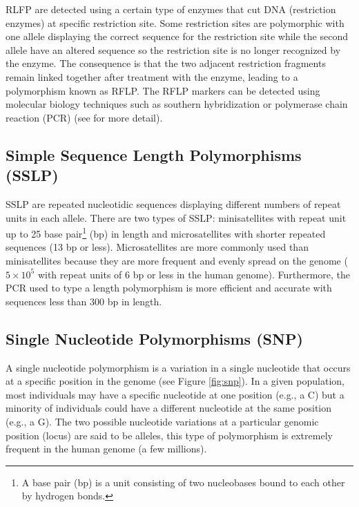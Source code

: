 \documentclass[]{book}
\begin{document}
RLFP are detected using a certain type of enzymes that cut DNA
(restriction enzymes) at specific restriction site. Some restriction
sites are polymorphic with one allele displaying the correct sequence
for the restriction site while the second allele have an altered
sequence so the restriction site is no longer recognized by the enzyme.
The consequence is that the two adjacent restriction fragments remain
linked together after treatment with the enzyme, leading to a
polymorphism known as RFLP. The RFLP markers can be detected using
molecular biology techniques such as southern hybridization or
polymerase chain reaction (PCR) (see \citep{garibyan2013research} for more
detail).

\hypertarget{simple-sequence-length-polymorphisms-sslp}{%
\subsection{Simple Sequence Length Polymorphisms (SSLP)}\label{simple-sequence-length-polymorphisms-sslp}}

SSLP are repeated nucleotidic sequences displaying different numbers of
repeat units in each allele. There are two types of SSLP: minisatellites
with repeat unit up to 25 base pair\footnote{A base pair (bp) is a unit consisting of two nucleobases bound to
  each other by hydrogen bonds.} (bp) in length and
microsatellites with shorter repeated sequences (13 bp or less).
Microsatellites are more commonly used than minisatellites because they
are more frequent and evenly spread on the genome (\(5 \times 10^5\) with
repeat units of 6 bp or less in the human genome). Furthermore, the PCR
used to type a length polymorphism is more efficient and accurate with
sequences less than 300 bp in length.

\hypertarget{single-nucleotide-polymorphisms-snp}{%
\subsection{Single Nucleotide Polymorphisms (SNP)}\label{single-nucleotide-polymorphisms-snp}}

A single nucleotide polymorphism is a variation in a single nucleotide
that occurs at a specific position in the genome (see Figure \ref{fig:snp}). In a given population, most individuals may have a
specific nucleotide at one position (e.g., a C) but a minority of
individuals could have a different nucleotide at the same position
(e.g., a G). The two possible nucleotide variations at a particular
genomic position (locus) are said to be alleles, this type of
polymorphism is extremely frequent in the human genome (a few millions).
\end{document}
